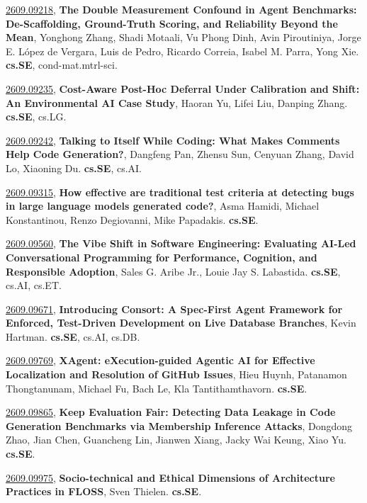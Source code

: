 \documentclass[9pt, a4paper]{article}
\theoremstyle{plain}
\theoremstyle{definition}
\theoremstyle{remark}
\newcommand{\arxivwithtarget}[3]{\hypertarget{#1}{}\href{https://arxiv.org/abs/#1}{#1}, \textbf{\textcolor{arxivblue}{#2}}, #3. }
\begin{document}
\arxivwithtarget{2609.09218}{The Double Measurement Confound in Agent Benchmarks: De-Scaffolding, Ground-Truth Scoring, and Reliability Beyond the Mean}{Yonghong Zhang, Shadi Motaali, Vu Phong Dinh, Avin Piroutiniya, Jorge E. López de Vergara, Luis de Pedro, Ricardo Correia, Isabel M. Parra, Yong Xie}\textbf{cs.SE}, cond-mat.mtrl-sci.



\arxivwithtarget{2609.09235}{Cost-Aware Post-Hoc Deferral Under Calibration and Shift: An Environmental AI Case Study}{Haoran Yu, Lifei Liu, Danping Zhang}\textbf{cs.SE}, cs.LG.



\arxivwithtarget{2609.09242}{Talking to Itself While Coding: What Makes Comments Help Code Generation?}{Dangfeng Pan, Zhensu Sun, Cenyuan Zhang, David Lo, Xiaoning Du}\textbf{cs.SE}, cs.AI.



\arxivwithtarget{2609.09315}{How effective are traditional test criteria at detecting bugs in large language models generated code?}{Asma Hamidi, Michael Konstantinou, Renzo Degiovanni, Mike Papadakis}\textbf{cs.SE}.



\arxivwithtarget{2609.09560}{The Vibe Shift in Software Engineering: Evaluating AI-Led Conversational Programming for Performance, Cognition, and Responsible Adoption}{Sales G. Aribe Jr., Louie Jay S. Labastida}\textbf{cs.SE}, cs.AI, cs.ET.



\arxivwithtarget{2609.09671}{Introducing Consort: A Spec-First Agent Framework for Enforced, Test-Driven Development on Live Database Branches}{Kevin Hartman}\textbf{cs.SE}, cs.AI, cs.DB.



\arxivwithtarget{2609.09769}{XAgent: eXecution-guided Agentic AI for Effective Localization and Resolution of GitHub Issues}{Hieu Huynh, Patanamon Thongtanunam, Michael Fu, Bach Le, Kla Tantithamthavorn}\textbf{cs.SE}.



\arxivwithtarget{2609.09865}{Keep Evaluation Fair: Detecting Data Leakage in Code Generation Benchmarks via Membership Inference Attacks}{Dongdong Zhao, Jian Chen, Guancheng Lin, Jianwen Xiang, Jacky Wai Keung, Xiao Yu}\textbf{cs.SE}.



\arxivwithtarget{2609.09975}{Socio-technical and Ethical Dimensions of Architecture Practices in FLOSS}{Sven Thielen}\textbf{cs.SE}.
\end{document}
